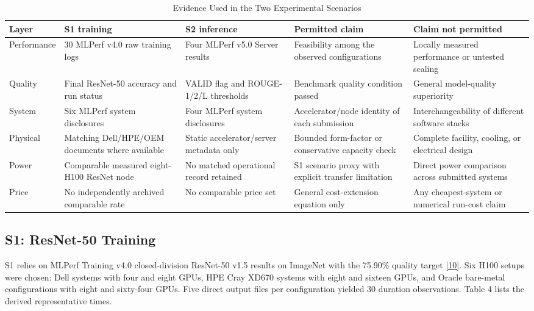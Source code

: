 \documentclass[final,3p,12pt,nopreprintline]{elsarticle}
\begin{document}
\begin{table}[htbp]
\caption{Evidence Used in the Two Experimental Scenarios}
\label{tab:evidence}
\centering
\footnotesize
\setlength{\tabcolsep}{3pt}
\renewcommand{\arraystretch}{1.1}
\begin{tabularx}{\textwidth}{p{2.2cm}XXXX}
\toprule
\textbf{Layer} & \textbf{S1 training} & \textbf{S2 inference} & \textbf{Permitted claim} & \textbf{Claim not permitted}\\
\midrule
Performance & 30 MLPerf v4.0 raw training logs & Four MLPerf v5.0 Server results & Feasibility among the observed configurations & Locally measured performance or untested scaling\\
Quality & Final ResNet-50 accuracy and run status & VALID flag and ROUGE-1/2/L thresholds & Benchmark quality condition passed & General model-quality superiority\\
System & Six MLPerf system disclosures & Four MLPerf system disclosures & Accelerator/node identity of each submission & Interchangeability of different software stacks\\
Physical & Matching Dell/HPE/OEM documents where available & Static accelerator/server metadata only & Bounded form-factor or conservative capacity check & Complete facility, cooling, or electrical design\\
Power & Comparable measured eight-H100 ResNet node & No matched operational record retained & S1 scenario proxy with explicit transfer limitation & Direct power comparison across submitted systems\\
Price & No independently archived comparable rate & No comparable price set & General cost-extension equation only & Any cheapest-system or numerical run-cost claim\\
\bottomrule
\end{tabularx}
\end{table}

\subsection{S1: ResNet-50 Training}


S1 relies on MLPerf Training v4.0 closed-division ResNet-50 v1.5 results on ImageNet with the 75.90\% quality target \hyperref[ref:10]{[10]}. Six H100 setups were chosen: Dell systems with four and eight GPUs, HPE Cray XD670 systems with eight and sixteen GPUs, and Oracle bare-metal configurations with eight and sixty-four GPUs. Five direct output files per configuration yielded 30 duration observations. Table 4 lists the derived representative times.
\end{document}
